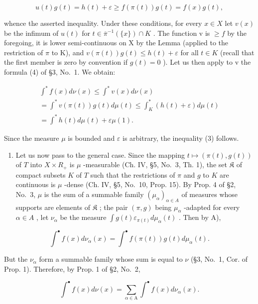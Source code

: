 \[
u (t) g (t) = h (t) + \varepsilon \geqslant f (\pi (t)) g (t) = f (x) g (t),
\]

whence the asserted inequality. Under these conditions, for every \(x \in X\) let \(v(x)\) be the infimum of \(u(t)\) for \(t \in \overline{\pi}^{-1}(\{x\}) \cap K\) . The function v is \(\geqslant f\) by the foregoing, it is lower semi-continuous on X by the Lemma (applied to the restriction of \(\pi\) to K), and \(v(\pi(t))g(t) \leqslant h(t) + \varepsilon\) for all \(t \in K\) (recall that the first member is zero by convention if \(g(t) = 0\) ). Let us then apply to v the formula (4) of §3, No.~1. We obtain:

\[
\begin{array}{l} \int^ {*} f (x) d \nu (x) \leqslant \int^ {*} v (x) d \nu (x) \\ = \int^ {*} v (\pi (t)) g (t) d \mu (t) \leqslant \int_ {K} ^ {*} (h (t) + \varepsilon) d \mu (t) \\ = \int^ {*} h (t) d \mu (t) + \varepsilon \mu (1). \end{array}\tag{4}
\]

Since the measure \(\mu\) is bounded and \(\varepsilon\) is arbitrary, the inequality (3) follows.

\begin{enumerate}
\def\labelenumi{\Alph{enumi})}
\setcounter{enumi}{1}
\tightlist
\item
  Let us now pass to the general case. Since the mapping \(t \mapsto (\pi(t), g(t))\) of \(T\) into \(X \times R_{+}\) is \(\mu\) -measurable (Ch. IV, §5, No.~3, Th. 1), the set \(\mathfrak{K}\) of compact subsets \(K\) of \(T\) such that the restrictions of \(\pi\) and \(g\) to \(K\) are continuous is \(\mu\) -dense (Ch. IV, §5, No.~10, Prop. 15). By Prop. 4 of §2, No.~3, \(\mu\) is the sum of a summable family \((\mu_{\alpha})_{\alpha \in A}\) of measures whose supports are elements of \(\mathfrak{K}\) ; the pair \((\pi, g)\) being \(\mu_{\alpha}\) -adapted for every \(\alpha \in A\) , let \(\nu_{\alpha}\) be the measure \(\int g(t)\varepsilon_{\pi(t)} d\mu_{\alpha}(t)\) . Then by A),
\end{enumerate}

\[
\int^ {\bullet} f (x) d \nu_ {\alpha} (x) = \int^ {\bullet} f (\pi (t)) g (t) d \mu_ {\alpha} (t).\tag{5}
\]

But the \(\nu_{\alpha}\) form a summable family whose sum is equal to \(\nu\) (§3, No.~1, Cor. of Prop. 1). Therefore, by Prop. 1 of §2, No.~2,

\[
\int^ {\bullet} f (x) d \nu (x) = \sum_ {\alpha \in \mathrm{A}} \int^ {\bullet} f (x) d \nu_ {\alpha} (x).\tag{6}
\]

